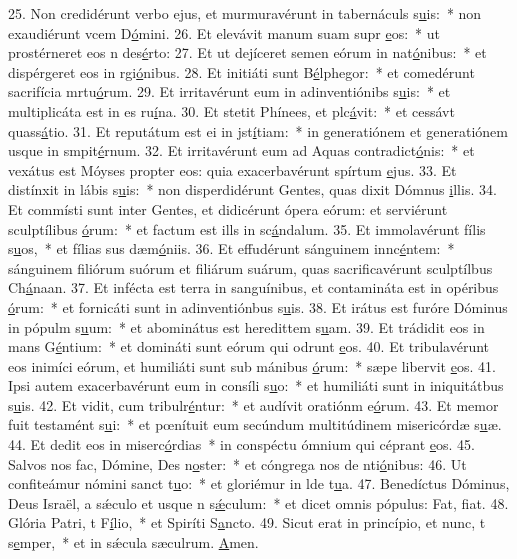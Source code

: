25. Non credidérunt verbo ejus, et murmuravérunt in tabernáculs s\uline{u}is:~* non exaudiérunt vcem D\uline{ó}mini.
26. Et elevávit manum suam supr \uline{e}os:~* ut prostérneret eos n des\uline{é}rto:
27. Et ut dejíceret semen eórum in nat\uline{ó}nibus:~* et dispérgeret eos in rgi\uline{ó}nibus.
28. Et initiáti sunt B\uline{é}lphegor:~* et comedérunt sacrifícia mrtu\uline{ó}rum.
29. Et irritavérunt eum in adinventiónibs s\uline{u}is:~* et multiplicáta est in es ru\uline{í}na.
30. Et stetit Phínees, et plc\uline{á}vit:~* et cessávt quass\uline{á}tio.
31. Et reputátum est ei in jst\uline{í}tiam:~* in generatiónem et generatiónem usque in smpit\uline{é}rnum.
32. Et irritavérunt eum ad Aquas contradict\uline{ó}nis:~* et vexátus est Móyses propter eos: quia exacerbavérunt spírtum \uline{e}jus.
33. Et distínxit in lábis s\uline{u}is:~* non disperdidérunt Gentes, quas dixit Dómnus \uline{i}llis.
34. Et commísti sunt inter Gentes, et didicérunt ópera eórum: et serviérunt sculptílibus \uline{ó}rum:~* et factum est ills in sc\uline{á}ndalum.
35. Et immolavérunt fílis s\uline{u}os,~* et fílias sus dæm\uline{ó}niis.
36. Et effudérunt sánguinem innc\uline{é}ntem:~* sánguinem filiórum suórum et filiárum suárum, quas sacrificavérunt sculptílbus Ch\uline{á}naan.
37. Et infécta est terra in sanguínibus, et contamináta est in opéribus \uline{ó}rum:~* et fornicáti sunt in adinventiónbus s\uline{u}is.
38. Et irátus est furóre Dóminus in pópulm s\uline{u}um:~* et abominátus est heredittem s\uline{u}am.
39. Et trádidit eos in mans G\uline{é}ntium:~* et domináti sunt eórum qui odrunt \uline{e}os.
40. Et tribulavérunt eos inimíci eórum, et humiliáti sunt sub mánibus \uline{ó}rum:~* sæpe libervit \uline{e}os.
41. Ipsi autem exacerbavérunt eum in consíli s\uline{u}o:~* et humiliáti sunt in iniquitátbus s\uline{u}is.
42. Et vidit, cum tribulr\uline{é}ntur:~* et audívit oratiónm e\uline{ó}rum.
43. Et memor fuit testamént s\uline{u}i:~* et pœnítuit eum secúndum multitúdinem misericórdæ s\uline{u}æ.
44. Et dedit eos in miserc\uline{ó}rdias~* in conspéctu ómnium qui céprant \uline{e}os.
45. Salvos nos fac, Dómine, Des n\uline{o}ster:~* et cóngrega nos de nti\uline{ó}nibus:
46. Ut confiteámur nómini sanct t\uline{u}o:~* et gloriémur in lde t\uline{u}a.
47. Benedíctus Dóminus, Deus Israël, a sǽculo et usque n s\uline{ǽ}culum:~* et dicet omnis pópulus: Fat, f\uline{i}at.
48. Glória Patri, t F\uline{í}lio,~* et Spiríti S\uline{a}ncto.
49. Sicut erat in princípio, et nunc, t s\uline{e}mper,~* et in sǽcula sæculrum. \uline{A}men.
